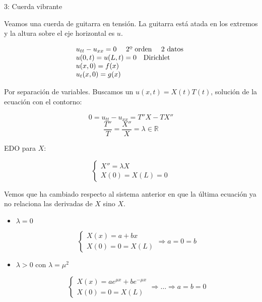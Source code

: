 		\begin{example}{3: Cuerda vibrante}

			Veamos una cuerda de guitarra en tensión. La guitarra está atada en los extremos y la altura sobre el eje horizontal es $u$.

			\begin{figure}[thbp]
			\centering
			\caption{}
			\label{fig:cuerdaGuitarra}
			\end{figure}


			\[  \begin{array}{l}
				u_{tt} - u_{xx} = 0 \quad \text{ 2º orden \quad 2 datos } \\
				u(0,t) = u(L,t) = 0 \quad \text{Dirichlet}\\
				u(x,0) = f(x) \\
				u_t(x,0) = g(x)
				\end{array}
			\]

			Por separación de variables. Buscamos un $u(x,t) = X(t) T(t)$, solución de la ecuación con el contorno:

			\[ 0 = u_{tt} - u_{xx} = T'' X - T X''\]
			\[ \frac{T''}{T} = \frac{X''}{X} = \lambda \in \mathbb{R}\]

			EDO para $X$:

			\[\begin{cases}
				X'' = \lambda X \\
				X(0) = X(L) = 0
			\end{cases}
			\]

			Vemos que ha cambiado respecto al sistema anterior en que la última ecuación ya no relaciona las derivadas de $X$ sino  $X$.

			\begin{itemize}
				\item $\lambda = 0$

					\[
					\left\{
					\begin{array}{l}
					X(x) = a + bx \\
					X(0) = 0 = X(L)
					\end{array}
					\right.
					\Rightarrow
					a = 0 = b
					\]

				\item $\lambda > 0$ con $\lambda = \mu^2$

					\[
					\left\{
					\begin{array}{l}
					X(x) = ae^{\mu x} + be^{-\mu x} \\
					X(0) = 0 = X(L)
					\end{array}
					\right.
					\Rightarrow … \Rightarrow
					a = b = 0
					\]


\end{itemize}
\end{example}
